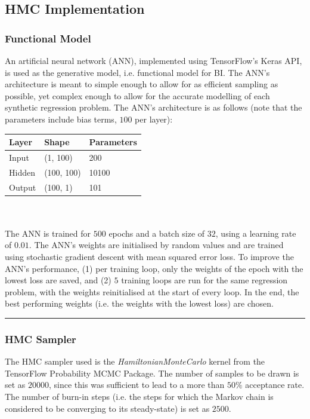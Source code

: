 \documentclass[conference]{IEEEtran}
\begin{document}
\subsection{HMC Implementation}
\subsubsection{Functional Model}
An artificial neural network (ANN), implemented using TensorFlow's Keras API, is used as the generative model, i.e. functional model for BI. The ANN's architecture is meant to simple enough to allow for as efficient sampling as possible, yet complex enough to allow for the accurate modelling of each synthetic regression problem. The ANN's architecture is as follows (note that the parameters include bias terms, $100$ per layer):\\

\begin{tabular}{| m{1cm} | m{1.5cm} | m{2cm} |}
    \hline
    \textbf{Layer} & \textbf{Shape} & \textbf{Parameters}\\
    \hline
    Input & (1, 100) & 200\\
    \hline
    Hidden & (100, 100) & 10100\\
    \hline
    Output & (100, 1) & 101\\
    \hline
\end{tabular}\\~\\

The ANN is trained for $500$ epochs and a batch size of $32$, using a learning rate of $0.01$. The ANN's weights are initialised by random values and are trained using stochastic gradient descent with mean squared error loss. To improve the ANN's performance, (1) per training loop, only the weights of the epoch with the lowest loss are saved, and (2) $5$ training loops are run for the same regression problem, with the weights reinitialised at the start of every loop. In the end, the best performing weights (i.e. the weights with the lowest loss) are chosen.

\par\noindent\rule{0.49\textwidth}{0.1pt}

\subsubsection{HMC Sampler}
The HMC sampler used is the \textit{HamiltonianMonteCarlo} kernel from the TensorFlow Probability MCMC Package. The number of samples to be drawn is set as $20000$, since this was sufficient to lead to a more than $50\%$ acceptance rate. The number of burn-in steps (i.e. the steps for which the Markov chain is considered to be converging to its steady-state) is set as $2500$.\\
\end{document}
